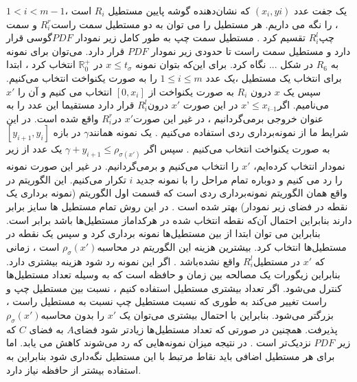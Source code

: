 یک جفت عدد $(x_{i},y{i})$ که نشان‌دهنده گوشه پایین مستطیل $R_{i}$ است ،$1< i < m - 1$ ، را نگه می داریم. 
هر مستطیل را می توان به دو مستطیل  سمت راست$ R^{r}_{i}$ و  سمت چپ$ R^{l}_{i}$ تقسیم کرد . مستطیل سمت چپ به طور کامل زیر نمودار $PDF$گوسی قرار دارد و مستطیل سمت راست تا حدودی زیر نمودار $PDF$  قرار دارد. می‌توان برای نمونه به $R_{6}$  در شکل ... نگاه کرد.
برای این‌که بتوان نمونه $x \leq t_{\sigma}$  در $\mathbb{R}^{+}_{0}$  انتخاب کرد ، ابتدا برای انتخاب یک مستطیل ،یک عدد $1 \leq i \leq m$ را به صورت یکنواخت انتخاب می‌کنیم.  سپس یک $ x$  درون $R_{i}$ به صورت یکنواخت  از  $[0, x_{i}]$ انتخاب می کنیم  و آن را $x'$  می‌نامیم. اگر$ x’\leq   x_{i – 1}$   در این صورت  $x'$   درون$ R^{l}_{i}$ قرار دارد مستقیما این عدد را به عنوان خروجی برمی‌گردانیم ، در غیر این صورت$x'$  در$ R^{r}_{i}$ واقع شده است. در این شرایط ما از نمونه‌برداری ردی استفاده می‌کنیم . یک نمونه همانند$\gamma$  در بازه $ [y_{i+1}, y_{i}]$ به صورت یکنواخت انتخاب می‌کنیم . سپس اگر $\gamma + y_{i+1}\leq \rho _{\sigma (x')}$ یک عدد از زیر نمودار انتخاب کرده‌ایم،   $x'$ را انتخاب می‌کنیم و برمی‌گردانیم. در غیر این صورت نمونه را رد می کنیم و دوباره تمام مراحل را  با نمونه‌ جدید $i$  تکرار می‌کنیم.
این الگوریتم در واقع همان الگوریتم نمونه‌برداری ردی است که قسمت اول الگوریتم (نمونه برداری یک نقطه در فضای زیر نمودار) بهتر شده است . در این روش تمام مستطیل ها سایز برابر دارند بنابراین احتمال آن‌که نقطه انتخاب شده در هرکداماز  مستطیل‌ها باشد برابر است. بنابراین می توان ابتدا از بین مستطیل‌ها نمونه برداری کرد و سپس یک نقطه در مستطیل‌ها انتخاب کرد.
بیشترین هزینه این الگوریتم‌ در محاسبه$\rho_{\sigma}(x')$  است ، زمانی که  $x'$ در مستطیل$ R^{l}_{i}$ واقع نشده‌باشد .  اگر این نمونه رد شود هزینه بیشتری دارد. بنابراین زیگورات یک مصالحه بین زمان و حافظه است که به وسیله تعداد مستطیل‌ها کنترل می‌شود. اگر تعداد بیشتری مستطیل استفاده کنیم ، نسبت بین مستطیل  چپ و راست تغییر می‌کند به طوری که نسبت مستطیل چپ نسبت به مستطیل راست ، بزرگتر می‌شود. بنابراین با احتمال بیشتری می‌توان  یک $x'$ را بدون محاسبه$\rho_{\sigma}(x')$    پذیرفت.  همچنین در صورتی که تعداد مستطیل‌ها زیادتر شود فضای$ A$  به فضای $C$   که زیر $PDF$ نزدیک‌تر است . در نتیجه میزان نمونه‌‌هایی که رد می‌شوند کاهش می یابد. اما برای هر مستطیل اضافی باید نقاط مرتبط با این مستطیل نگه‌داری شود بنابراین به استفاده بیشتر از حافظه نیاز دارد.
